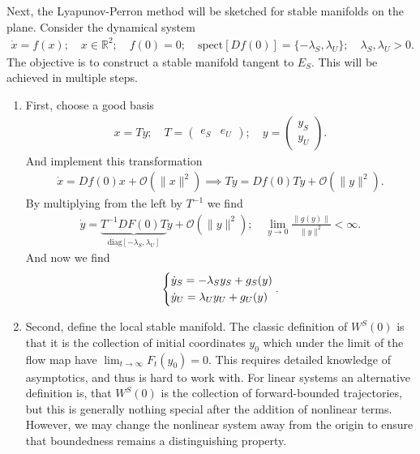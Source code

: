 Next, the Lyapunov-Perron method will be sketched for stable manifolds on the plane. Consider the dynamical system
\begin{align}
	\dot{x} = f(x);\quad x \in \mathbb{R}^{2};\quad f(0)=0;\quad  \textrm{spect} [Df(0)] = \{ - \lambda _{S}, \lambda _{U}\};\quad \lambda _S, \lambda_U > 0. \label{eq9:LP_method1}
\end{align}
The objective is to construct a stable manifold tangent to $E_{S}$. This will be achieved in multiple steps.
\begin{enumerate}
	\item First, choose a good basis
		\begin{align}
			x = Ty;\quad T = 
			\begin{pmatrix}
				e_{S} & e_{U}
			\end{pmatrix}
		;\quad y =
		\begin{pmatrix}
			y_S \\
			y_U
		\end{pmatrix}
		.
		\end{align}
	And implement this transformation 
	\begin{align}
		\dot{x} = Df(0)x + \mathcal{O}(\|x\|^{2}) \implies T\dot{y} = Df(0)Ty + \mathcal{O}(\| y\|^{2}).
	\end{align}
	By multiplying from the left by $T^{-1}$ we find
	\begin{align}
		\dot{y} = \underbrace{T^{-1}DF(0)T}_{ \textrm{diag} [-\lambda_S, \lambda_U ]}y + \mathcal{O}(\|y\|^{2});\quad \lim_{y \to 0} \frac{\|g(y)\|}{\|y\|^{2}}< \infty .
	\end{align}
	And now we find
	\begin{align}
		\begin{dcases}
			\dot{y}_{S} = - \lambda _{S}y_{S} + g_{S}(y) \\
			\dot{y}_{U} = \lambda _{U}y_{U} + g_{U}(y)
		\end{dcases}
		.
	\end{align}

\item Second, define the local stable manifold. The classic definition of $W^{S}(0)$ is that it is the collection of initial coordinates $y_0$ which under the limit of the flow map have $\lim_{t \to \infty }F_{t}(y_0)=0$. This requires detailed knowledge of asymptotics, and thus is hard to work with. For linear systems an alternative definition is, that $W^S(0)$ is the collection of forward-bounded trajectories, but this is generally nothing special after the addition of nonlinear terms. However, we may change the nonlinear system away from the origin to ensure that boundedness remains a distinguishing property. 


\end{enumerate}
